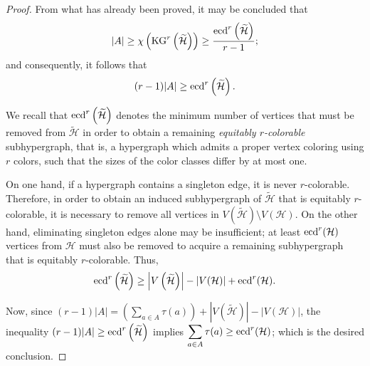 \documentclass[11pt]{amsart}
\theoremstyle{definition}
\begin{document}
\begin{proof}
{		From what has already been proved, it may be concluded that 
		$$|A| \geq \chi\left({\rm KG}^r\left(\widetilde{{\mathcal H}}\right)\right)\geq { {\rm ecd}^r\left(\widetilde{{\mathcal H}}\right)\over r-1};$$
		and consequently, it follows that 
		$$(r-1)|A| \geq {\rm ecd}^r\left(\widetilde{{\mathcal H}}\right).$$
		
		We recall that ${\rm ecd}^r\left(\widetilde{{\mathcal H}}\right)$ denotes the minimum number of vertices that must be
		removed from $\widetilde{{\mathcal H}}$ in order to obtain a remaining {\it equitably $r$-colorable} subhypergraph, that is, a hypergraph which admits a proper vertex coloring using $r$ colors, such that the sizes of the color classes differ by at most one.
		
		\noindent
		On one hand, if a hypergraph contains a singleton edge, it is never $r$-colorable. Therefore, in order to obtain an induced subhypergraph of $\widetilde{\mathcal{H}}$ that is equitably $r$-colorable, it is necessary to remove all vertices in $V(\widetilde{\mathcal{H}}) \setminus V(\mathcal{H})$. On the other hand, eliminating singleton edges alone
		may be insufficient; at least ${\rm ecd}^r(\mathcal{H})$ vertices from $\mathcal{H}$ must also be removed to acquire a remaining subhypergraph that is equitably $r$-colorable.
		Thus, 
		$${\rm ecd}^r\left(\widetilde{{\mathcal H}}\right) \geq \left|V\left(\widetilde{{\mathcal H}}\right)\right|-|V({\mathcal H})|+{\rm ecd}^r({\mathcal H}).$$
		
		Now, since 
		$(r-1)|A| = \left( \displaystyle\sum_{a\in A}\tau(a) \right) + \left|V\left(\widetilde{{\mathcal H}}\right)\right|-|V({\mathcal H})|$,
		the inequality
		$(r-1)|A| \geq {\rm ecd}^r\left(\widetilde{{\mathcal H}}\right)$
		implies
		$\displaystyle\sum_{a\in A}\tau(a) \geq  {\rm ecd}^r({\mathcal H})$;
		which is the desired conclusion.
	}
\end{proof}
\end{document}
